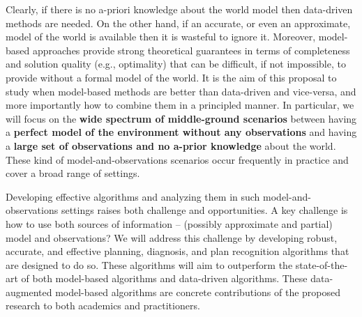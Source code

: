 \documentclass[12pt]{article}
\begin{document}
Clearly, if there is no a-priori knowledge about the world model then data-driven methods are needed. On the other hand, if an accurate, or even an approximate, model of the world is available then it is wasteful to ignore it. %
Moreover, model-based approaches provide strong theoretical guarantees in terms of completeness and solution quality (e.g., optimality) that can be difficult, if not impossible, to provide without a formal model of the world. %
It is the aim of this proposal to study when model-based methods are better than data-driven and vice-versa, and more importantly how to combine them in a principled manner. In particular, we will focus on the {\bf wide spectrum of middle-ground scenarios} between having a {\bf perfect model of the environment without any observations} and having a {\bf large set of observations and no a-prior knowledge} about the world. These kind of model-and-observations scenarios occur frequently in practice and cover a broad range of settings. %



Developing effective algorithms and analyzing them in such model-and-observations settings raises both challenge and opportunities. A key challenge is how to use both sources of information -- (possibly approximate and partial) model and observations? 
We will address this challenge by developing robust, accurate, and effective planning, diagnosis, and plan recognition algorithms that are designed to do so. 
These algorithms will aim to outperform the state-of-the-art of both model-based algorithms and data-driven algorithms. These data-augmented model-based algorithms are concrete contributions of the proposed research to both academics and practitioners. 
\end{document}
